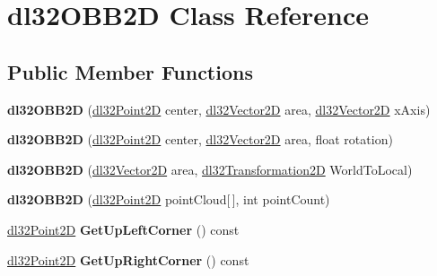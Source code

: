 \hypertarget{classdl32_o_b_b2_d}{\section{dl32\-O\-B\-B2\-D Class Reference}
\label{classdl32_o_b_b2_d}
}
\subsection*{Public Member Functions}
\begin{DoxyCompactItemize}
\item 
\hypertarget{classdl32_o_b_b2_d_aa80cd6e84b8f87ff2077a537f0164648}{{\bfseries dl32\-O\-B\-B2\-D} (\hyperlink{structdl32_point2_d}{dl32\-Point2\-D} center, \hyperlink{structdl32_vector2_d}{dl32\-Vector2\-D} area, \hyperlink{structdl32_vector2_d}{dl32\-Vector2\-D} x\-Axis)}\label{classdl32_o_b_b2_d_aa80cd6e84b8f87ff2077a537f0164648}

\item 
\hypertarget{classdl32_o_b_b2_d_af05aa8ac825ffb2e8cbfc07d7ada2ecd}{{\bfseries dl32\-O\-B\-B2\-D} (\hyperlink{structdl32_point2_d}{dl32\-Point2\-D} center, \hyperlink{structdl32_vector2_d}{dl32\-Vector2\-D} area, float rotation)}\label{classdl32_o_b_b2_d_af05aa8ac825ffb2e8cbfc07d7ada2ecd}

\item 
\hypertarget{classdl32_o_b_b2_d_a0b1656702b9df784ac347f66caa69672}{{\bfseries dl32\-O\-B\-B2\-D} (\hyperlink{structdl32_vector2_d}{dl32\-Vector2\-D} area, \hyperlink{classdl32_transformation2_d}{dl32\-Transformation2\-D} World\-To\-Local)}\label{classdl32_o_b_b2_d_a0b1656702b9df784ac347f66caa69672}

\item 
\hypertarget{classdl32_o_b_b2_d_af75209a4778aef565a6c8d18635c1cbd}{{\bfseries dl32\-O\-B\-B2\-D} (\hyperlink{structdl32_point2_d}{dl32\-Point2\-D} point\-Cloud\mbox{[}$\,$\mbox{]}, int point\-Count)}\label{classdl32_o_b_b2_d_af75209a4778aef565a6c8d18635c1cbd}

\item 
\hypertarget{classdl32_o_b_b2_d_abd33b9687bb2ff79e86f3c2a1d2779ff}{\hyperlink{structdl32_point2_d}{dl32\-Point2\-D} {\bfseries Get\-Up\-Left\-Corner} () const }\label{classdl32_o_b_b2_d_abd33b9687bb2ff79e86f3c2a1d2779ff}

\item 
\hypertarget{classdl32_o_b_b2_d_a6f190337e9b41f030b45c5e5929140b5}{\hyperlink{structdl32_point2_d}{dl32\-Point2\-D} {\bfseries Get\-Up\-Right\-Corner} () const }\label{classdl32_o_b_b2_d_a6f190337e9b41f030b45c5e5929140b5}


\end{DoxyCompactItemize}
